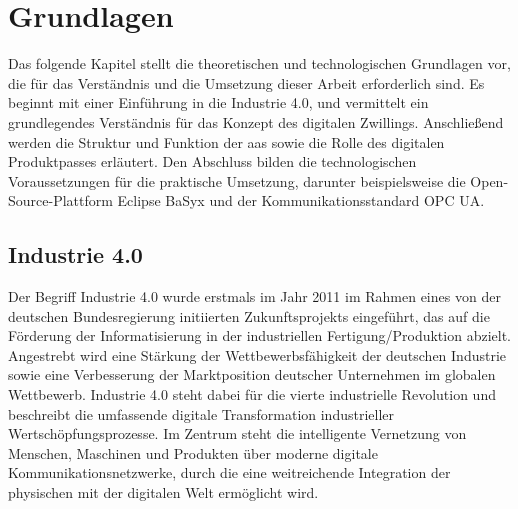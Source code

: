 \section{Grundlagen}
Das folgende Kapitel stellt die theoretischen und technologischen Grundlagen vor, die für das Verständnis und die Umsetzung dieser Arbeit erforderlich sind.
Es beginnt mit einer Einführung in die Industrie 4.0, und vermittelt ein grundlegendes Verständnis für das Konzept des digitalen Zwillings.
Anschließend werden die Struktur und Funktion der \acs{aas} sowie die Rolle des digitalen Produktpasses erläutert.
Den Abschluss bilden die technologischen Voraussetzungen für die praktische Umsetzung, darunter beispielsweise die Open-Source-Plattform Eclipse BaSyx und der Kommunikationsstandard OPC UA.
\subsection{Industrie 4.0}

Der Begriff Industrie 4.0 wurde erstmals im Jahr 2011 im Rahmen eines von der deutschen Bundesregierung initiierten Zukunftsprojekts eingeführt, das auf die Förderung der Informatisierung in der industriellen Fertigung/Produktion abzielt.
Angestrebt wird eine Stärkung der Wettbewerbsfähigkeit der deutschen Industrie sowie eine Verbesserung der Marktposition deutscher Unternehmen im globalen Wettbewerb.
Industrie 4.0 steht dabei für die vierte industrielle Revolution und beschreibt die umfassende digitale Transformation industrieller Wertschöpfungsprozesse. 
Im Zentrum steht die intelligente Vernetzung von Menschen, Maschinen und Produkten über moderne digitale Kommunikationsnetzwerke, durch die eine weitreichende Integration der physischen mit der digitalen Welt ermöglicht wird.

